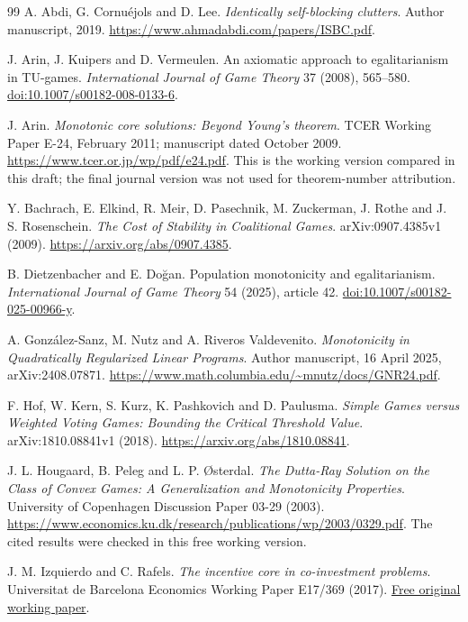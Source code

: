 \begin{thebibliography}{99}
A. Abdi, G. Cornu\'{e}jols and D. Lee.
\emph{Identically self-blocking clutters}. Author manuscript, 2019.
\url{https://www.ahmadabdi.com/papers/ISBC.pdf}.

J. Arin, J. Kuipers and D. Vermeulen.
An axiomatic approach to egalitarianism in TU-games.
\emph{International Journal of Game Theory} 37 (2008), 565--580.
\href{https://doi.org/10.1007/s00182-008-0133-6}{doi:10.1007/s00182-008-0133-6}.

J. Arin. \emph{Monotonic core solutions: Beyond Young's theorem}.
TCER Working Paper E-24, February 2011; manuscript dated October 2009.
\url{https://www.tcer.or.jp/wp/pdf/e24.pdf}.
This is the working version compared in this draft; the final journal version
was not used for theorem-number attribution.

Y. Bachrach, E. Elkind, R. Meir, D. Pasechnik, M. Zuckerman,
J. Rothe and J. S. Rosenschein.
\emph{The Cost of Stability in Coalitional Games}.
arXiv:0907.4385v1 (2009).
\url{https://arxiv.org/abs/0907.4385}.

B. Dietzenbacher and E. Do\u{g}an.
Population monotonicity and egalitarianism.
\emph{International Journal of Game Theory} 54 (2025), article 42.
\href{https://doi.org/10.1007/s00182-025-00966-y}{doi:10.1007/s00182-025-00966-y}.

A. Gonz\'{a}lez-Sanz, M. Nutz and A. Riveros Valdevenito.
\emph{Monotonicity in Quadratically Regularized Linear Programs}.
Author manuscript, 16 April 2025, arXiv:2408.07871.
\url{https://www.math.columbia.edu/~mnutz/docs/GNR24.pdf}.

F. Hof, W. Kern, S. Kurz, K. Pashkovich and D. Paulusma.
\emph{Simple Games versus Weighted Voting Games: Bounding the Critical Threshold Value}.
arXiv:1810.08841v1 (2018).
\url{https://arxiv.org/abs/1810.08841}.

J. L. Hougaard, B. Peleg and L. P. \O sterdal.
\emph{The Dutta-Ray Solution on the Class of Convex Games:
A Generalization and Monotonicity Properties}.
University of Copenhagen Discussion Paper 03-29 (2003).
\url{https://www.economics.ku.dk/research/publications/wp/2003/0329.pdf}.
The cited results were checked in this free working version.

J. M. Izquierdo and C. Rafels.
\emph{The incentive core in co-investment problems}.
Universitat de Barcelona Economics Working Paper E17/369 (2017).
\href{https://diposit.ub.edu/server/api/core/bitstreams/d325b225-7dde-44ff-8a35-cd848434e593/content}{Free original working paper}.


\end{thebibliography}
